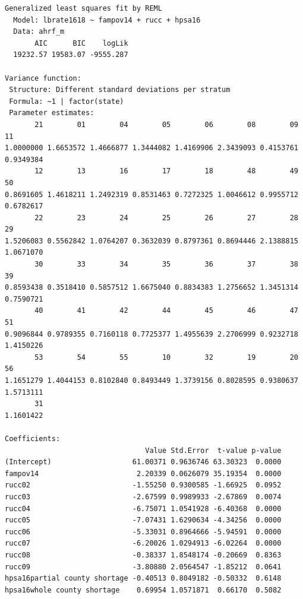 \documentclass[
  letterpaper,
  DIV=11,
  numbers=noendperiod]{scrreprt}
\begin{document}
\begin{verbatim}
Generalized least squares fit by REML
  Model: lbrate1618 ~ fampov14 + rucc + hpsa16 
  Data: ahrf_m 
       AIC      BIC    logLik
  19232.57 19583.07 -9555.287

Variance function:
 Structure: Different standard deviations per stratum
 Formula: ~1 | factor(state) 
 Parameter estimates:
       21        01        04        05        06        08        09        11 
1.0000000 1.6653572 1.4666877 1.3444082 1.4169906 2.3439093 0.4153761 0.9349384 
       12        13        16        17        18        48        49        50 
0.8691605 1.4618211 1.2492319 0.8531463 0.7272325 1.0046612 0.9955712 0.6782617 
       22        23        24        25        26        27        28        29 
1.5206083 0.5562842 1.0764207 0.3632039 0.8797361 0.8694446 2.1388815 1.0671070 
       30        33        34        35        36        37        38        39 
0.8593438 0.3518410 0.5857512 1.6675040 0.8834383 1.2756652 1.3451314 0.7590721 
       40        41        42        44        45        46        47        51 
0.9096844 0.9789355 0.7160118 0.7725377 1.4955639 2.2706999 0.9232718 1.4150226 
       53        54        55        10        32        19        20        56 
1.1651279 1.4044153 0.8102840 0.8493449 1.3739156 0.8028595 0.9380637 1.5713111 
       31 
1.1601422 

Coefficients:
                                 Value Std.Error  t-value p-value
(Intercept)                   61.00371 0.9636746 63.30323  0.0000
fampov14                       2.20339 0.0626079 35.19354  0.0000
rucc02                        -1.55250 0.9300585 -1.66925  0.0952
rucc03                        -2.67599 0.9989933 -2.67869  0.0074
rucc04                        -6.75071 1.0541928 -6.40368  0.0000
rucc05                        -7.07431 1.6290634 -4.34256  0.0000
rucc06                        -5.33031 0.8964666 -5.94591  0.0000
rucc07                        -6.20026 1.0294913 -6.02264  0.0000
rucc08                        -0.38337 1.8548174 -0.20669  0.8363
rucc09                        -3.80880 2.0564547 -1.85212  0.0641
hpsa16partial county shortage -0.40513 0.8049182 -0.50332  0.6148
hpsa16whole county shortage    0.69954 1.0571871  0.66170  0.5082


\end{verbatim}
\end{document}
